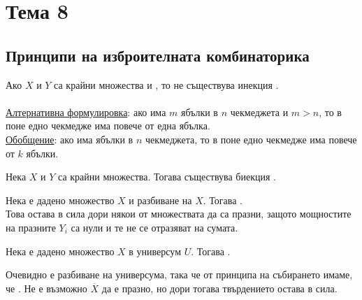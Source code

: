 \section{Тема 8}

\subsection{Принципи на изброителната комбинаторика}

\begin{principle}[на Дирихле]
    Ако \(X\) и \(Y\) са крайни множества и , то не съществува инекция . \\ \\
    \underline{Алтернативна формулировка}: ако има \(m\) ябълки в \(n\) чекмеджета и \(m > n\), то в поне едно 
    чекмедже има повече от една ябълка. \\
    \underline{Обобщение}: ако има  ябълки в \(n\) чекмеджета, то в поне едно чекмедже има повече 
    от \(k\) ябълки. 
\end{principle}

\begin{principle}[на биекцията]
    Нека \(X\) и \(Y\) са крайни множества. Тогава  \totw съществува биекция .
\end{principle}

\begin{principle}
    Нека е дадено множество \(X\) и разбиване  на \(X\). Тогава 
    . \\

    Това остава в сила дори някои от множествата  да са празни, защото мощностите на 
    празните \(Y_i\) са нули и те не се отразяват на сумата.
\end{principle}

\begin{principle}[на изваждането]
    Нека е дадено множество \(X\) в универсум \(U\). Тогава .

    Очевидно  е разбиване на универсума, така че от принципа на събирането 
    имаме, че .
    Не е възможно \(\overline{X}\) да е празно, но дори тогава твърдението остава в сила.
\end{principle}

